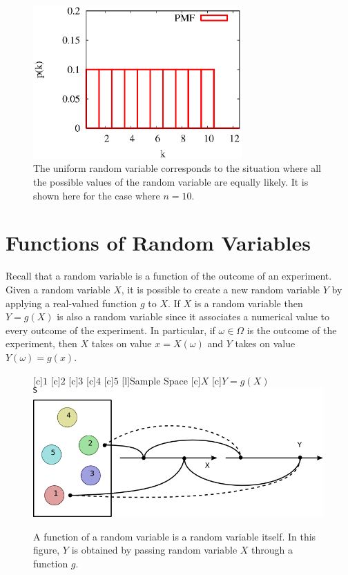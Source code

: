 \begin{figure}[ht]
\begin{center}
\includegraphics[width=8cm]{Figures/5chapter/uniform}
\end{center}
\caption{The uniform random variable corresponds to the situation where all the possible values of the random variable are equally likely.
It is shown here for the case where $n = 10$.}
\end{figure}

\section{Functions of Random Variables}
\label{subsection:FunctionDiscreteRV}
Recall that a random variable is a function of the outcome of an experiment.
Given a random variable $X$, it is possible to create a new random variable $Y$ by applying a real-valued function $g$ to $X$.
If $X$ is a random variable then $Y = g(X)$ is also a random variable since it associates a numerical value to every outcome of the experiment.
In particular, if $\omega \in \Omega$ is the outcome of the experiment, then $X$ takes on value $x = X(\omega)$ and $Y$ takes on value $Y(\omega) = g(x)$.

\begin{figure}[ht]
\begin{center}
\begin{psfrags}
[c]{$1$}
[c]{$2$}
[c]{$3$}
[c]{$4$}
[c]{$5$}
[l]{Sample Space}
[c]{$X$}
[c]{$Y = g(X)$}
\includegraphics[width=11.12cm]{Figures/5Chapter/fcn}
\end{psfrags}
\caption{A function of a random variable is a random variable itself.
In this figure, $Y$ is obtained by passing random variable $X$ through a function $g$.}
\end{center}
\end{figure}

